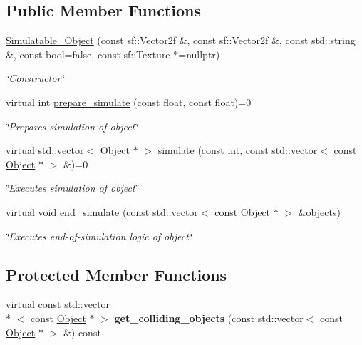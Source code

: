 \subsection*{Public Member Functions}
\begin{DoxyCompactItemize}
\item 
\hyperlink{classSimulatable__Object_a0ca1611db5809ac78440a862ba986af7}{Simulatable\+\_\+\+Object} (const sf\+::\+Vector2f \&, const sf\+::\+Vector2f \&, const std\+::string \&, const bool=false, const sf\+::\+Texture $\ast$=nullptr)
\begin{DoxyCompactList}\small\item\em \char`\"{}\+Constructor\char`\"{} \end{DoxyCompactList}\item 
virtual int \hyperlink{classSimulatable__Object_abe7c02fe250ef5be42011890d8a7b37b}{prepare\+\_\+simulate} (const float, const float)=0
\begin{DoxyCompactList}\small\item\em \char`\"{}\+Prepares simulation of object\char`\"{} \end{DoxyCompactList}\item 
virtual std\+::vector$<$ \hyperlink{classObject}{Object} $\ast$ $>$ \hyperlink{classSimulatable__Object_a60fb2da770367330360a90afc7b724f1}{simulate} (const int, const std\+::vector$<$ const \hyperlink{classObject}{Object} $\ast$ $>$ \&)=0
\begin{DoxyCompactList}\small\item\em \char`\"{}\+Executes simulation of object\char`\"{} \end{DoxyCompactList}\item 
virtual void \hyperlink{classSimulatable__Object_a1c542c4d9cb7ba923ea9f974e5f03e84}{end\+\_\+simulate} (const std\+::vector$<$ const \hyperlink{classObject}{Object} $\ast$ $>$ \&objects)
\begin{DoxyCompactList}\small\item\em \char`\"{}\+Executes end-\/of-\/simulation logic of object\char`\"{} \end{DoxyCompactList}\end{DoxyCompactItemize}
\subsection*{Protected Member Functions}
\begin{DoxyCompactItemize}
\item 
\hypertarget{classSimulatable__Object_a2d7252861e8dea6b3bb9909421b88766}{virtual const std\+::vector\\*
$<$ const \hyperlink{classObject}{Object} $\ast$ $>$ {\bfseries get\+\_\+colliding\+\_\+objects} (const std\+::vector$<$ const \hyperlink{classObject}{Object} $\ast$ $>$ \&) const }\label{classSimulatable__Object_a2d7252861e8dea6b3bb9909421b88766}

\end{DoxyCompactItemize}
